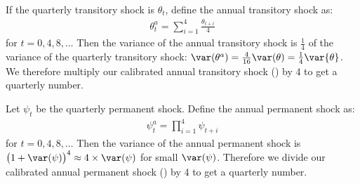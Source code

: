 
If the quarterly transitory shock is $\theta_t$, define the annual transitory shock as:
\begin{eqnarray*}
\theta^a_t = \sum_{i=1}^{4}\frac{\theta_{t+i}}{4}
\end{eqnarray*}
for $t = {0,4,8,\dots}$ Then the variance of the annual transitory shock is $\frac{1}{4}$ of the variance of the quarterly transitory shock: $\var(\theta^a)=\frac{4}{16}\var(\theta)=\frac14\var{\theta}$. We therefore multiply our calibrated annual transitory shock ($ $) by 4 to get a quarterly number.

Let $\psi_t$ be the quarterly permanent shock. Define the annual permanent shock as:
\begin{eqnarray*}
\psi^a_t = \prod_{i=1}^{4} \psi_{t+i}
\end{eqnarray*}
for $t ={0,4,8,\dots}$ Then the variance of the annual permanent shock is $\big(1+\var(\psi)\big)^4 \approx 4\times\var(\psi)$ for small $\var(\psi)$. Therefore we divide our calibrated annual permanent shock ($ $) by 4 to get a quarterly number.



